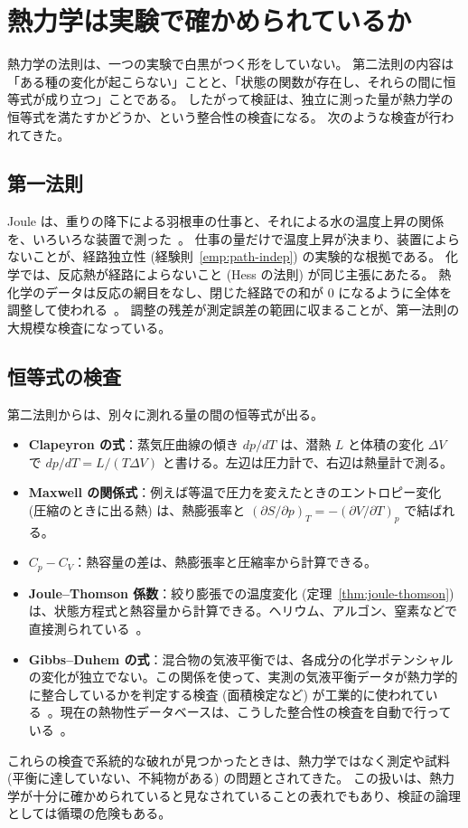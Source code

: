 \section{熱力学は実験で確かめられているか}
\label{sec:tests}

熱力学の法則は、一つの実験で白黒がつく形をしていない。
第二法則の内容は「ある種の変化が起こらない」ことと、「状態の関数が存在し、それらの間に恒等式が成り立つ」ことである。
したがって検証は、独立に測った量が熱力学の恒等式を満たすかどうか、という整合性の検査になる。
次のような検査が行われてきた。

\subsection{第一法則}

Joule は、重りの降下による羽根車の仕事と、それによる水の温度上昇の関係を、いろいろな装置で測った~\cite{Joule1850}。
仕事の量だけで温度上昇が決まり、装置によらないことが、経路独立性 (経験則~\ref{emp:path-indep}) の実験的な根拠である。
化学では、反応熱が経路によらないこと (Hess の法則) が同じ主張にあたる。
熱化学のデータは反応の網目をなし、閉じた経路での和が $0$ になるように全体を調整して使われる~\cite{CODATA1989}。
調整の残差が測定誤差の範囲に収まることが、第一法則の大規模な検査になっている。

\subsection{恒等式の検査}

第二法則からは、別々に測れる量の間の恒等式が出る。
\begin{itemize}
  \item \textbf{Clapeyron の式}：蒸気圧曲線の傾き $dp/dT$ は、潜熱 $L$ と体積の変化 $\Delta V$ で $dp/dT = L/(T\Delta V)$ と書ける。左辺は圧力計で、右辺は熱量計で測る。
  \item \textbf{Maxwell の関係式}：例えば等温で圧力を変えたときのエントロピー変化 (圧縮のときに出る熱) は、熱膨張率と $(\partial S/\partial p)_T = -(\partial V/\partial T)_p$ で結ばれる。
  \item \textbf{$C_p - C_V$}：熱容量の差は、熱膨張率と圧縮率から計算できる。
  \item \textbf{Joule--Thomson 係数}：絞り膨張での温度変化 (定理~\ref{thm:joule-thomson}) は、状態方程式と熱容量から計算できる。ヘリウム、アルゴン、窒素などで直接測られている~\cite{RoebuckOsterberg1933}。
  \item \textbf{Gibbs--Duhem の式}：混合物の気液平衡では、各成分の化学ポテンシャルの変化が独立でない。この関係を使って、実測の気液平衡データが熱力学的に整合しているかを判定する検査 (面積検定など) が工業的に使われている~\cite{Herington1947, RedlichKister1948, VanNess1973}。現在の熱物性データベースは、こうした整合性の検査を自動で行っている~\cite{Frenkel2005}。
\end{itemize}
これらの検査で系統的な破れが見つかったときは、熱力学ではなく測定や試料 (平衡に達していない、不純物がある) の問題とされてきた。
この扱いは、熱力学が十分に確かめられていると見なされていることの表れでもあり、検証の論理としては循環の危険もある。

